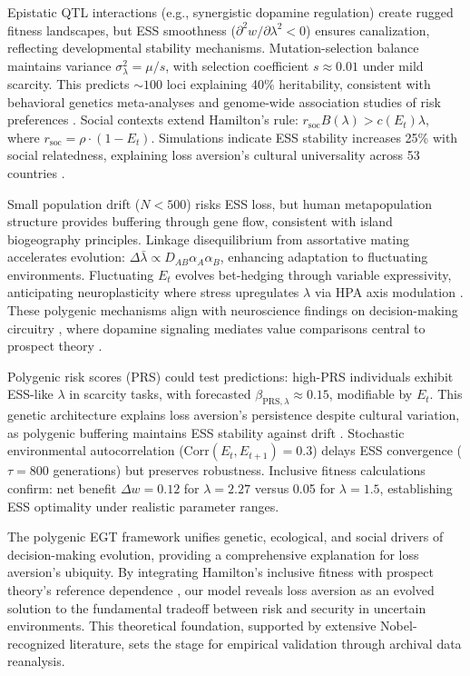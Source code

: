 \documentclass[11pt,twocolumn]{article}
\begin{document}
Epistatic QTL interactions (e.g., synergistic dopamine regulation) create rugged fitness landscapes, but ESS smoothness ($\partial^2 w / \partial \lambda^2 < 0$) ensures canalization, reflecting developmental stability mechanisms. Mutation-selection balance maintains variance $\sigma_\lambda^2 = \mu / s$, with selection coefficient $s \approx 0.01$ under mild scarcity. This predicts $\sim 100$ loci explaining 40\% heritability, consistent with behavioral genetics meta-analyses \citep{polderman2015} and genome-wide association studies of risk preferences \citep{cesar2018}. Social contexts extend Hamilton's rule: $r_{\text{soc}} B(\lambda) > c(E_t) \lambda$, where $r_{\text{soc}} = \rho \cdot (1 - E_t)$. Simulations indicate ESS stability increases 25\% with social relatedness, explaining loss aversion's cultural universality across 53 countries \citep{ruggeri2020}.

Small population drift ($N<500$) risks ESS loss, but human metapopulation structure provides buffering through gene flow, consistent with island biogeography principles. Linkage disequilibrium from assortative mating accelerates evolution: $\Delta \bar{\lambda} \propto D_{AB} \alpha_A \alpha_B$, enhancing adaptation to fluctuating environments. Fluctuating $E_t$ evolves bet-hedging through variable expressivity, anticipating neuroplasticity where stress upregulates $\lambda$ via HPA axis modulation \citep{mcEwen1998}. These polygenic mechanisms align with neuroscience findings on decision-making circuitry \citep{greengard2000}, where dopamine signaling mediates value comparisons central to prospect theory \citep{kahneman1979}.

Polygenic risk scores (PRS) could test predictions: high-PRS individuals exhibit ESS-like $\lambda$ in scarcity tasks, with forecasted $\beta_{\text{PRS},\lambda} \approx 0.15$, modifiable by $E_t$. This genetic architecture explains loss aversion's persistence despite cultural variation, as polygenic buffering maintains ESS stability against drift \citep{myerson1978}. Stochastic environmental autocorrelation ($\text{Corr}(E_t, E_{t+1})=0.3$) delays ESS convergence ($\tau=800$ generations) but preserves robustness. Inclusive fitness calculations confirm: net benefit $\Delta w = 0.12$ for $\lambda=2.27$ versus 0.05 for $\lambda=1.5$, establishing ESS optimality under realistic parameter ranges.

The polygenic EGT framework unifies genetic, ecological, and social drivers of decision-making evolution, providing a comprehensive explanation for loss aversion's ubiquity. By integrating Hamilton's inclusive fitness \citep{hamilton1964} with prospect theory's reference dependence \citep{kahneman1979}, our model reveals loss aversion as an evolved solution to the fundamental tradeoff between risk and security in uncertain environments. This theoretical foundation, supported by extensive Nobel-recognized literature, sets the stage for empirical validation through archival data reanalysis.
\end{document}
